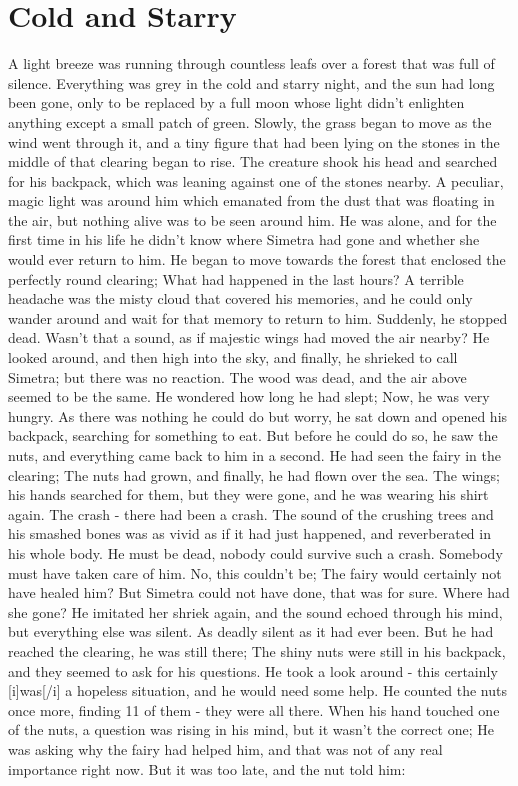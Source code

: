 \chapter{Cold and Starry}
\label{cha:cold-starry}
A light breeze was running through countless leafs over a forest that was full of silence. Everything was grey in the cold and starry night, and the sun had long been gone, only to be replaced by a full moon whose light didn't enlighten anything except a small patch of green. Slowly, the grass began to move as the wind went through it, and a tiny figure that had been lying on the stones in the middle of that clearing began to rise. The creature shook his head and searched for his backpack, which was leaning against one of the stones nearby. A peculiar, magic light was around him which emanated from the dust that was floating in the air, but nothing alive was to be seen around him. 
He was alone, and for the first time in his life he didn't know where Simetra had gone and whether she would ever return to him. 
He began to move towards the forest that enclosed the perfectly round clearing; What had happened in the last hours? A terrible headache was the misty cloud that covered his memories, and he could only wander around and wait for that memory to return to him. Suddenly, he stopped dead. Wasn't that a sound, as if majestic wings had moved the air nearby? He looked around, and then high into the sky, and finally, he shrieked to call Simetra; but there was no reaction. The wood was dead, and the air above seemed to be the same. 
He wondered how long he had slept; Now, he was very hungry. As there was nothing he could do but worry, he sat down and opened his backpack, searching for something to eat. But before he could do so, he saw the nuts, and everything came back to him in a second. He had seen the fairy in the clearing; The nuts had grown, and finally, he had flown over the sea. The wings; his hands searched for them, but they were gone, and he was wearing his shirt again. The crash - there had been a crash. The sound of the crushing trees and his smashed bones was as vivid as if it had just happened, and reverberated in his whole body. He must be dead, nobody could survive such a crash. 
Somebody must have taken care of him. 
No, this couldn't be; The fairy would certainly not have healed him? But Simetra could not have done, that was for sure. Where had she gone? 
He imitated her shriek again, and the sound echoed through his mind, but everything else was silent. 
As deadly silent as it had ever been. But he had reached the clearing, he was still there; The shiny nuts were still in his backpack, and they seemed to ask for his questions. He took a look around - this certainly [i]was[/i] a hopeless situation, and he would need some help. He counted the nuts once more, finding 11 of them - they were all there. When his hand touched one of the nuts, a question was rising in his mind, but it wasn't the correct one; He was asking why the fairy had helped him, and that was not of any real importance right now. But it was too late, and the nut told him: 
